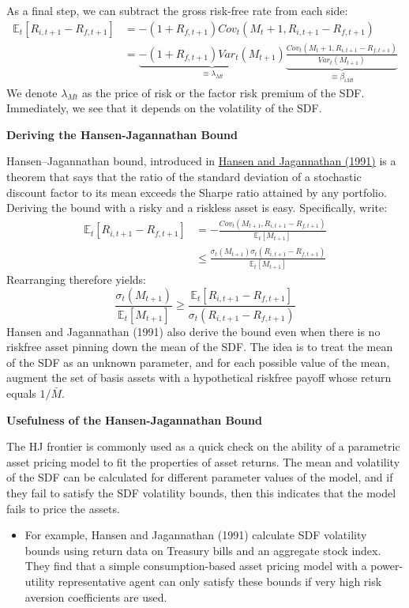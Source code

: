 \documentclass[
]{book}
\providecommand{\tightlist}{%
  \setlength{\itemsep}{0pt}\setlength{\parskip}{0pt}}
\begin{document}
As a final step, we can subtract the gross risk-free rate from each side:
\[
\begin{aligned}
\mathbb{E}_t[R_{i,t+1} - R_{f,t+1}] &= -(1+R_{f,t+1}) Cov_t(M_t+1, R_{i,t+1} - R_{f,t+1})\\
                                    &= \underbrace{-(1+R_{f,t+1})Var_t(M_{t+1})}_{\equiv \lambda_{Mt}}\underbrace{\frac{Cov_t(M_t+1, R_{i,t+1} - R_{f,t+1})}{Var_t(M_{t+1})}}_{\equiv \beta_{iMt}}
\end{aligned}
\]
We denote \(\lambda_{Mt}\) as the price of risk or the factor risk premium of the SDF. Immediately, we see that it depends on the volatility of the SDF.

\textbf{Deriving the Hansen-Jagannathan Bound}

Hansen--Jagannathan bound, introduced in \protect\hyperlink{HansJaga:91}{Hansen and Jagannathan (1991)} is a theorem that says that the ratio of the standard deviation of a stochastic discount factor to its mean exceeds the Sharpe ratio attained by any portfolio. Deriving the bound with a risky and a riskless asset is easy. Specifically, write:
\[
\begin{aligned}
\mathbb{E}_t[R_{i,t+1} - R_{f,t+1}] &= -\frac{Cov_t(M_{t+1}, R_{i,t+1} - R_{f,t+1})}{\mathbb{E}_t[M_{t+1}]}\\
                                    &\leq \frac{\sigma_t(M_{t+1})\sigma_t(R_{i,t+1} - R_{f,t+1})}{\mathbb{E}_t[M_{t+1}]}
\end{aligned}
\]
Rearranging therefore yields:
\[
\frac{\sigma_t(M_{t+1})}{\mathbb{E}_t[M_{t+1}]} \geq \frac{\mathbb{E}_t[R_{i,t+1} - R_{f,t+1}]}{\sigma_t(R_{i,t+1} - R_{f,t+1})}
\]
Hansen and Jagannathan (1991) also derive the bound even when there is no riskfree asset pinning down the mean of the SDF. The idea is to treat the mean of the SDF as an unknown parameter, and for each possible value of the mean, augment the set of basis assets with a hypothetical riskfree payoff whose return equals \(1/\bar{M}\).

\textbf{Usefulness of the Hansen-Jagannathan Bound}

The HJ frontier is commonly used as a quick check on the ability of a parametric asset pricing model to fit the properties of asset returns. The mean and volatility of the SDF can be calculated for different parameter values of the model, and if they fail to satisfy the SDF volatility bounds, then this indicates that the model fails to price the assets.

\begin{itemize}
\tightlist
\item
  For example, Hansen and Jagannathan (1991) calculate SDF volatility bounds using return data on Treasury bills and an aggregate stock index. They find that a simple consumption-based asset pricing model with a power-utility representative agent can only satisfy these bounds if very high risk aversion coefficients are used.
\end{itemize}
\end{document}
